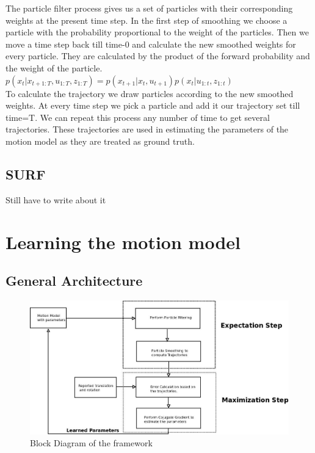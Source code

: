 \documentclass[12pt]{dalcsthesis}
\begin{document}
The particle filter process gives us a set of particles with their corresponding weights at the present time step. In the first step of smoothing we choose a particle with the probability proportional to the weight of the particles. Then we move a time step back till time-0 and calculate the new smoothed weights for every particle. They are calculated by the product of the forward probability and the weight of the particle. 
\\
$ p(x_{t}|x_{t+1:T},u_{1:T},z_{1:T})=p(x_{t+1}|x_{t},u_{t+1})p(x_{t}|u_{1:t},z_{1:t})$
\\
To calculate the trajectory we draw particles according to the new smoothed weights. At every time step we pick a particle and add it our trajectory set till time=T. We can repeat this process any number of time to get several trajectories. These trajectories are used in estimating the parameters of the motion model as they are treated as ground truth.
 
 

\section{SURF}
Still have to write about it

\chapter{Learning the motion model}
\section{General Architecture}


\begin{figure}[hbtp]
\caption{Block Diagram of the framework}
\centering
\includegraphics[scale=0.5]{Diagram1.jpeg}
\end{figure}
\end{document}
